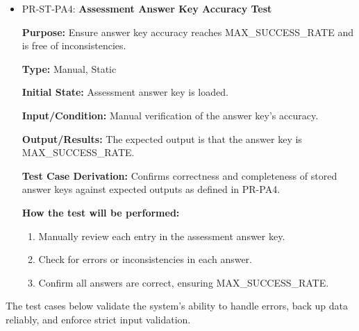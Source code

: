 \documentclass[12pt, titlepage]{article}
\begin{document}
\begin{itemize}
  \item PR-ST-PA4: \textbf{Assessment Answer Key Accuracy Test}
    \begin{mdframed}[linewidth=0.5mm]
      \textbf{Purpose:} Ensure answer key accuracy reaches MAX\_SUCCESS\_RATE and is free of inconsistencies. \par
      \textbf{Type:} Manual, Static \par
      \textbf{Initial State:} Assessment answer key is loaded. \par
      \textbf{Input/Condition:} Manual verification of the answer key’s accuracy. \par
      \textbf{Output/Results:} The expected output is that the answer key is \\ MAX\_SUCCESS\_RATE. \par
      \textbf{Test Case Derivation:} Confirms correctness and completeness of stored answer keys against expected outputs as defined in PR-PA4. \par
      \textbf{How the test will be performed:}
      \begin{enumerate}[noitemsep]
        \item Manually review each entry in the assessment answer key.
        \item Check for errors or inconsistencies in each answer.
        \item Confirm all answers are correct, ensuring MAX\_SUCCESS\_RATE.
      \end{enumerate}
  \end{mdframed}
\end{itemize}

\hspace{2em}The test cases below validate the system’s ability to handle errors, 
back up data reliably, and enforce strict input validation.
\end{document}
